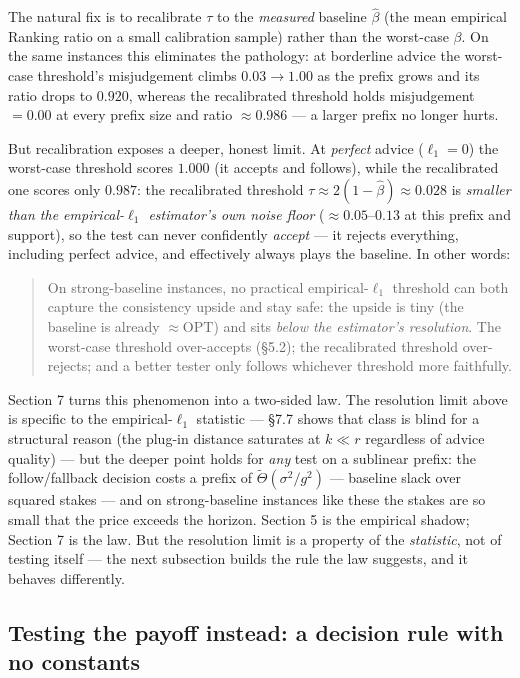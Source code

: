 The natural fix is to recalibrate \(\tau\) to the \emph{measured}
baseline \(\hat\beta\) (the mean empirical Ranking ratio on a small
calibration sample) rather than the worst-case \(\beta\). On the same
instances this eliminates the pathology: at borderline advice the
worst-case threshold's misjudgement climbs \(0.03\to1.00\) as the prefix
grows and its ratio drops to \(0.920\), whereas the recalibrated
threshold holds misjudgement \(=0.00\) at every prefix size and ratio
\(\approx0.986\) --- a larger prefix no longer hurts.

But recalibration exposes a deeper, honest limit. At \emph{perfect}
advice (\(\ell_1=0\)) the worst-case threshold scores \(1.000\) (it
accepts and follows), while the recalibrated one scores only \(0.987\):
the recalibrated threshold \(\tau\approx 2(1-\hat\beta)\approx 0.028\)
is \emph{smaller than the empirical-\(\ell_1\) estimator's own noise
floor} (\(\approx 0.05\)--\(0.13\) at this prefix and support), so the
test can never confidently \emph{accept} --- it rejects everything,
including perfect advice, and effectively always plays the baseline. In
other words:

\begin{quote}
On strong-baseline instances, no practical empirical-\(\ell_1\)
threshold can both capture the consistency upside and stay safe: the
upside is tiny (the baseline is already \(\approx\mathrm{OPT}\)) and
sits \emph{below the estimator's resolution}. The worst-case threshold
over-accepts (§5.2); the recalibrated threshold over-rejects; and a
better tester only follows whichever threshold more faithfully.
\end{quote}

Section 7 turns this phenomenon into a two-sided law. The resolution
limit above is specific to the empirical-\(\ell_1\) statistic --- §7.7
shows that class is blind for a structural reason (the plug-in distance
saturates at \(k \ll r\) regardless of advice quality) --- but the
deeper point holds for \emph{any} test on a sublinear prefix: the
follow/fallback decision costs a prefix of
\(\tilde\Theta(\sigma^2/g^2)\) --- baseline slack over squared stakes
--- and on strong-baseline instances like these the stakes are so small
that the price exceeds the horizon. Section 5 is the empirical shadow;
Section 7 is the law. But the resolution limit is a property of the
\emph{statistic}, not of testing itself --- the next subsection builds
the rule the law suggests, and it behaves differently.

\subsection{Testing the payoff instead: a decision rule with no
constants}

